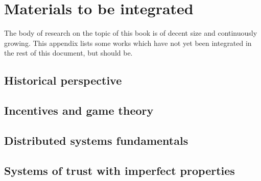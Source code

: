 \chapter{Materials to be integrated}
The body of research on the topic of this book is of decent size and continuously growing. 
This appendix lists some works which have not yet been integrated in the rest of this document, but should be.

\section{Historical perspective}

\section{Incentives and game theory}

\section{Distributed systems fundamentals}

\section{Systems of trust with imperfect properties}
